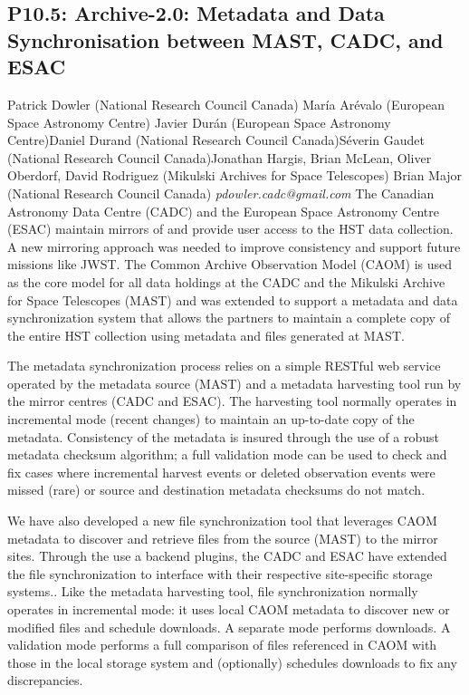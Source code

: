\documentclass{report}
\begin{document}
\subsection*{P10.5: Archive-2.0: Metadata and Data Synchronisation between MAST, CADC, and ESAC}
\bigskip
Patrick Dowler (National Research Council Canada) \newline María Arévalo (European Space Astronomy Centre) \newline  Javier Durán (European Space Astronomy Centre)\newline  Daniel Durand (National Research Council Canada)\newline Séverin Gaudet (National Research Council Canada)\newline  Jonathan Hargis, Brian McLean, Oliver Oberdorf, David Rodriguez (Mikulski Archives for Space Telescopes)
Brian Major (National Research Council Canada)\newline\newline
{\it pdowler.cadc@gmail.com}\newline
\newline\newline
The Canadian Astronomy Data Centre (CADC) and the European Space Astronomy Centre (ESAC) maintain mirrors of and provide user access to the HST data collection. A new mirroring approach was needed to improve consistency and support future missions like JWST. The Common Archive Observation Model (CAOM) is used as the core model for all data holdings at the CADC and the Mikulski Archive for Space Telescopes (MAST) and was extended to support a metadata and data synchronization system that allows the partners to maintain a complete copy of the entire HST collection using metadata and files generated at MAST.

The metadata synchronization process relies on a simple RESTful web service operated by the metadata source (MAST) and a metadata harvesting tool run by the mirror centres (CADC and ESAC). The harvesting tool normally operates in incremental mode (recent changes) to maintain an up-to-date copy of the metadata. Consistency of the metadata is insured through the use of a robust metadata checksum algorithm; a full validation mode can be used to check and fix cases where incremental harvest events or deleted observation events were missed (rare) or source and destination metadata checksums do not match.

We have also developed a new file synchronization tool that leverages CAOM metadata to discover and retrieve files from the source (MAST) to the mirror sites.  Through the use a backend plugins, the CADC and ESAC have extended the file synchronization to interface with their respective site-specific storage systems.. Like the metadata harvesting tool, file synchronization normally operates in incremental mode: it uses local CAOM metadata to discover new or modified files and schedule downloads. A separate mode performs downloads. A validation mode performs a full comparison of files referenced in CAOM with those in the local storage system and (optionally) schedules downloads to fix any discrepancies.
\end{document}
